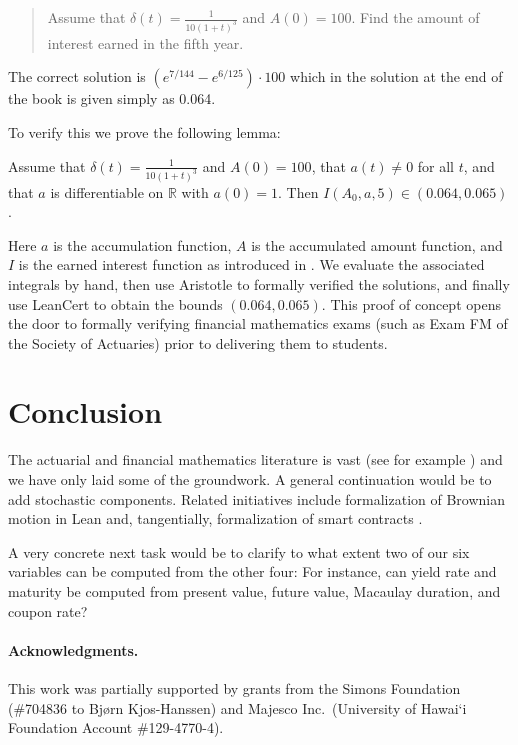 \begin{quote}
	Assume that $\delta(t)=\frac1{10(1+t)^3}$ and $A(0)=100$. Find the amount of interest earned in the fifth year.
\end{quote}

The correct solution is
$(e^{7/144}-e^{6/125})\cdot 100$ which in the solution at the end of the book \cite[Appendix B]{ChanTse2021_finmath} is given simply as 0.064.

To verify this we prove the following lemma:
\begin{lemma}\label{chan_tse_exe_1_36}
	Assume that $\delta(t)=\frac1{10(1+t)^3}$ and $A(0)=100$, that $a(t)\ne 0$ for all $t$,
	and that $a$ is differentiable on $\mathbb R$ with $a(0)=1$.
	Then $I(A_0,a,5)\in (0.064, 0.065)$.
\end{lemma}
Here $a$ is the accumulation function, $A$ is the accumulated amount function, and $I$ is the earned interest function as introduced in \cite{ChanTse2021_finmath}.
We evaluate the associated integrals by hand, then use Aristotle to formally verified the solutions,
and finally use LeanCert to obtain the bounds $(0.064, 0.065)$.
This proof of concept opens the door to formally verifying financial mathematics exams (such as Exam FM of the Society of Actuaries) prior to delivering them to students.


\section{Conclusion}
	The actuarial and financial mathematics literature is vast (see for example \cite{MR2500627}) and we have only laid some of the groundwork. A general continuation would be to add stochastic components. Related initiatives include formalization of Brownian motion in Lean \cite{degenne2025formalizationbrownianmotionlean} and, tangentially, formalization of smart contracts \cite{10.1145/3700601}.

	A very concrete next task would be to clarify to what extent two of our six variables can be computed from the other four:
	For instance, can yield rate and maturity be computed from present value, future value, Macaulay duration, and coupon rate?

\paragraph{Acknowledgments.}
This work was partially supported by grants from the Simons Foundation (\#704836
to Bj{\o}rn Kjos-Hanssen) and Majesco Inc.~(University of Hawai\textquoteleft i Foundation
Account \#129-4770-4).
\newpage

